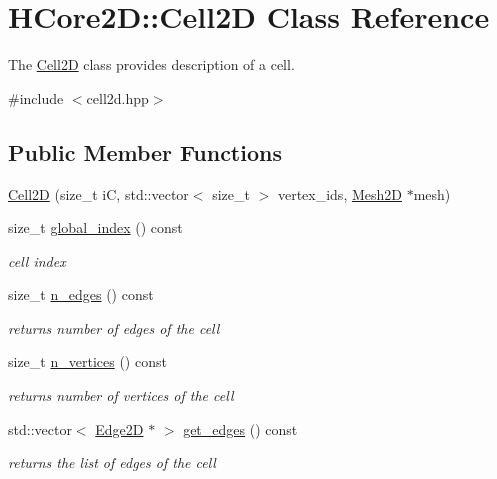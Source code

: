 \hypertarget{classHCore2D_1_1Cell2D}{}\section{H\+Core2D\+:\+:Cell2D Class Reference}
\label{classHCore2D_1_1Cell2D}


The \hyperlink{classHCore2D_1_1Cell2D}{Cell2D} class provides description of a cell.  




{\ttfamily \#include $<$cell2d.\+hpp$>$}

\subsection*{Public Member Functions}
\begin{DoxyCompactItemize}
\item 
\hyperlink{classHCore2D_1_1Cell2D_a6c10c6ca8ed2368091ce15af8e455d4e}{Cell2D} (size\+\_\+t iC, std\+::vector$<$ size\+\_\+t $>$ vertex\+\_\+ids, \hyperlink{classHCore2D_1_1Mesh2D}{Mesh2D} $\ast$mesh)
\item 
size\+\_\+t \hyperlink{group__Mesh2D_gafb6e681ad305f1f1c8c05f505d495e33}{global\+\_\+index} () const
\begin{DoxyCompactList}\small\item\em cell index \end{DoxyCompactList}\item 
size\+\_\+t \hyperlink{group__Mesh2D_ga94f504fc9c1f97b8a7b0d1a85324ef69}{n\+\_\+edges} () const
\begin{DoxyCompactList}\small\item\em returns number of edges of the cell \end{DoxyCompactList}\item 
size\+\_\+t \hyperlink{group__Mesh2D_ga5fded2feb63dd72a17ceb003ba09f02c}{n\+\_\+vertices} () const
\begin{DoxyCompactList}\small\item\em returns number of vertices of the cell \end{DoxyCompactList}\item 
\mbox{\label{classHCore2D_1_1Cell2D_ad3c7842a181976770dff4d8ce71c525d}} 
std\+::vector$<$ \hyperlink{classHCore2D_1_1Edge2D}{Edge2D} $\ast$ $>$ \hyperlink{classHCore2D_1_1Cell2D_ad3c7842a181976770dff4d8ce71c525d}{get\+\_\+edges} () const
\begin{DoxyCompactList}\small\item\em returns the list of edges of the cell \end{DoxyCompactList}\item 

\end{DoxyCompactItemize}
